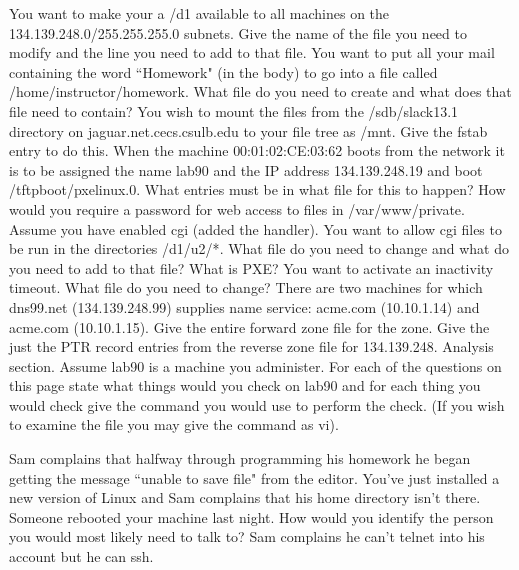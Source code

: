 \ques
You want to make your a 
{\ltt{}/d1}
available to all machines on the
{\ltt{}134.139.248.0/255.255.255.0} subnets.
Give the name of the file you need to modify and the line you need to
add to that file.
\vskip 1.2in
\ques
You want to put all your mail containing the word ``Homework" (in the body)
to go into a file called {\ltt{}/home/instructor/homework}.
What file do you need to create and what does that file need to contain?
\vskip 1.6in
\vfill\eject
\ques
You wish to mount the files from the
{\ltt{}/sdb/slack13.1} directory on {\ltt{}jaguar.net.cecs.csulb.edu}
to your file tree as {\ltt{}/mnt}.
Give the {\ltt{}fstab} entry to do this.
\vskip 0.5in
\ques
When the machine {\ltt{}00:01:02:CE:03:62} boots from the network
it is to be assigned the name {\ltt{}lab90} and the IP address
{\ltt{}134.139.248.19} and boot {\ltt{}/tftpboot/pxelinux.0}.
What entries must be in what file for this to happen?
\vskip 2.0in
\ques
How would you require a password for web access to files in
{\ltt{}/var/www/private}.
\vskip 2.0in
\ques
Assume you have enabled {\ltt{}cgi} (added the handler).
You want to allow {\ltt{}cgi} files to be run in the directories
{\ltt{}/d1/u2/*}.
What file do you need to change and what do you need to add to that file?
\vskip 2.2in
\vfill\eject
\ques
What is PXE?
\vskip 0.8in
\ques
You want to activate an inactivity timeout.
What file do you need to change?
\vskip 0.7in
\ques
There are two machines for which {\ltt{}dns99.net} ({\ltt{}134.139.248.99})
supplies name service:
{\ltt{}acme.com} ({\ltt{}10.10.1.14}) and 
{\ltt{}acme.com} ({\ltt{}10.10.1.15}).
Give the entire forward zone file for the zone.
\vfill
\ques
Give the just the {\ltt{}PTR} record entries from the reverse zone file for
{\ltt{}134.139.248}.
\vskip 1.2in
\eject
Analysis section. Assume {\ltt{}lab90} is a machine you administer.
For each of the questions on this page
state what things would you check on {\ltt{}lab90}
and for each thing you would check give the command you would use to
perform the check. (If you wish to examine the file you may give the
command as {\ltt{}vi}).

\ques
Sam complains that halfway through programming his homework
he began getting the message ``unable to save file" from the editor.
\vfill
\ques
You've just installed a new version of Linux and
Sam complains that his home directory isn't there.
\vfill
\ques
Someone rebooted your machine last night.
How would you identify the person you would most likely
need to talk to?
\vfill
\ques
Sam complains he can't {\ltt{}telnet} into his account
but he can {\ltt{}ssh}.
\bye
